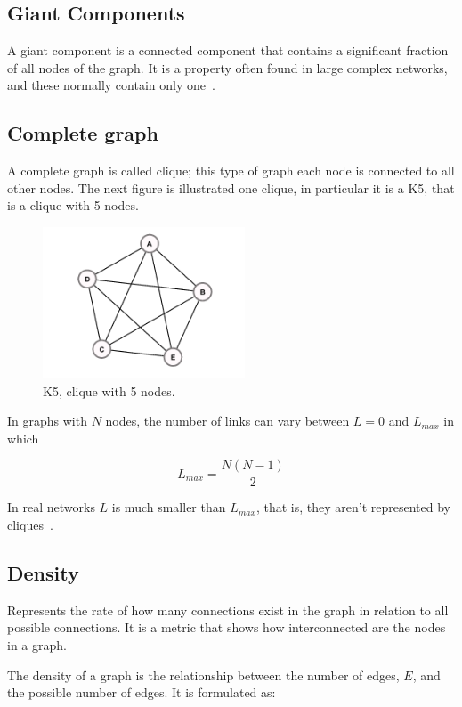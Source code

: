 \documentclass{article}
\begin{document}
\begin{multicols}{2}
\subsection{Giant Components}

A giant component is a connected component that contains a significant fraction of all nodes of the graph. It is a property often found in large complex networks, and these normally contain only one~\cite{NCM}.


\subsection{Complete graph}

A complete graph is called clique; this type of graph each node is connected to all other nodes. The next figure is illustrated one clique, in particular it is a K5, that is a clique with 5 nodes.


\begin{figure}
\centering
\includegraphics[width=6cm,height=4.5cm]{Figures/5-clique}
\caption{K5, clique with 5 nodes.}
\label{fig:figure5}
\end{figure}

In graphs with $N$ nodes, the number of links can vary between $L=0$ and $L_{max}$ in which

$$
L_{max}=\frac{N(N-1)}{2}
$$

In real networks $L$ is much smaller than $L_{max}$, that is, they aren’t represented by cliques~\cite{NS}.


\subsection{Density}

Represents the rate of how many connections exist in the graph in relation to all possible connections. It is a metric that shows how interconnected are the nodes in a graph.

The density of a graph is the relationship between the number of edges, $E$, and the possible number of edges. It is formulated as:


\end{multicols}
\end{document}

